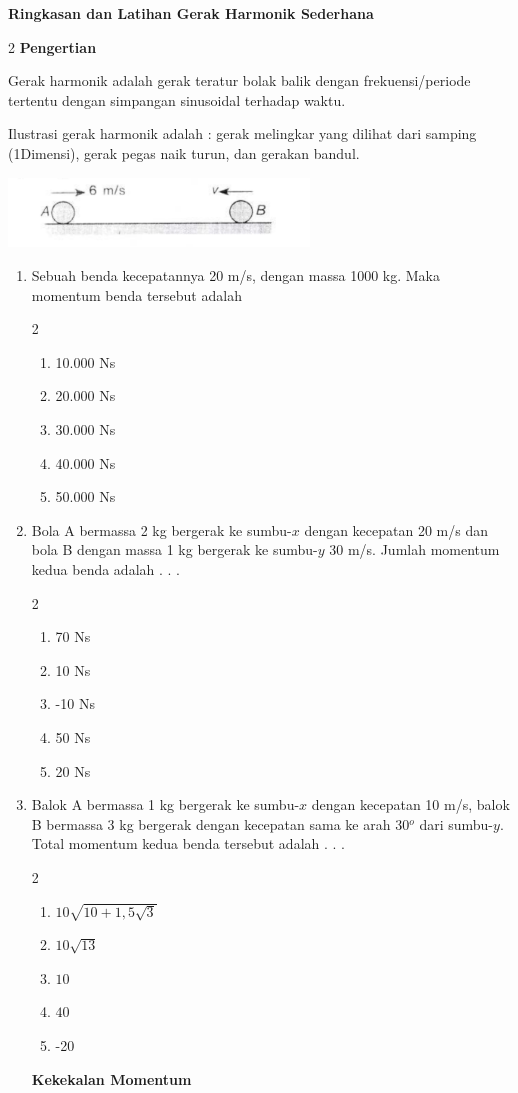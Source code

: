 \documentclass[10pt,a4paper]{extarticle}
\newcommand{\pilgani}[1]{                            \vspace{-0.3cm}\begin{multicols}{2}
 \begin{enumerate}[label=\Alph*., itemsep=0pt,topsep=0pt,leftmargin=*,align=Center]#1                     \end{enumerate}
 \phantom{ini cuma sapi, wedus, dan ayam}
 \end{multicols}}
\begin{document}
 \textbf{Ringkasan dan Latihan Gerak Harmonik Sederhana} \phantom{ini nama siswa yang aaamengerjakan soal kuis ini }  

\begin{multicols*}{2}
\textbf{Pengertian}

Gerak harmonik adalah gerak teratur bolak balik dengan frekuensi/periode tertentu dengan simpangan sinusoidal terhadap waktu. 

Ilustrasi gerak harmonik adalah : gerak melingkar yang dilihat dari samping (1Dimensi), gerak pegas naik turun, dan gerakan bandul.

\includegraphics[width=8cm]{pic/mom1}

\begin{enumerate}
\item Sebuah benda kecepatannya 20 m/s, dengan massa 1000 kg. Maka momentum benda tersebut adalah 
\pilgani{
        \item 10.000 Ns
        \item 20.000 Ns
        \item 30.000 Ns
        \item 40.000 Ns
        \item 50.000 Ns
        }
\item Bola A bermassa 2 kg bergerak ke sumbu-$x$ dengan kecepatan 20 m/s dan bola B dengan massa 1 kg bergerak ke sumbu-$y$ 30 m/s. Jumlah momentum kedua benda adalah . . .
\pilgani{
        \item 70 Ns
        \item 10 Ns
        \item -10 Ns
        \item 50 Ns
        \item 20 Ns
        }

\item Balok A bermassa 1 kg bergerak ke sumbu-$x$ dengan kecepatan 10 m/s, balok B bermassa 3 kg bergerak dengan kecepatan sama ke arah 30$^o$ dari sumbu-$y$. Total momentum kedua benda tersebut adalah . . .
\pilgani{
        \item $10\sqrt{10+1,5\sqrt{3}}$
        \item $10\sqrt{13}$
        \item $10$
        \item $40$
        \item -20
        }
\vspace{3cm}
\textbf{Kekekalan Momentum}


\end{enumerate}
\end{multicols*}
\end{document}
